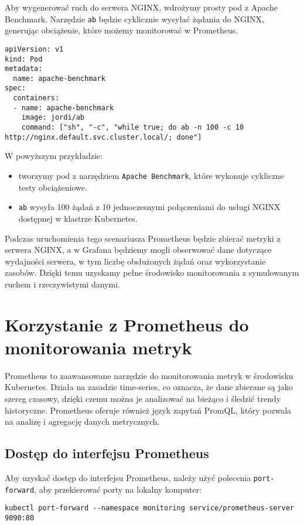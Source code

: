 \documentclass{article}
\begin{document}
Aby wygenerować ruch do serwera NGINX, wdrożymy prosty pod z Apache Benchmark. Narzędzie \texttt{ab} będzie cyklicznie wysyłać żądania do NGINX, generując obciążenie, które możemy monitorować w Prometheus.

\begin{lstlisting}
apiVersion: v1
kind: Pod
metadata:
  name: apache-benchmark
spec:
  containers:
  - name: apache-benchmark
    image: jordi/ab
    command: ["sh", "-c", "while true; do ab -n 100 -c 10 http://nginx.default.svc.cluster.local/; done"]
\end{lstlisting}

W powyższym przykładzie:
\begin{itemize}
  \item tworzymy pod z narzędziem \texttt{Apache Benchmark}, które wykonuje cykliczne testy obciążeniowe.
  \item \texttt{ab} wysyła 100 żądań z 10 jednoczesnymi połączeniami do usługi NGINX dostępnej w klastrze Kubernetes.
\end{itemize}

Podczas uruchomienia tego scenariusza Prometheus będzie zbierać metryki z serwera NGINX, a w Grafana będziemy mogli obserwować dane dotyczące wydajności serwera, w tym liczbę obsłużonych żądań oraz wykorzystanie zasobów. Dzięki temu uzyskamy pełne środowisko monitorowania z symulowanym ruchem i rzeczywistymi danymi.



\section{Korzystanie z Prometheus do monitorowania metryk}

Prometheus to zaawansowane narzędzie do monitorowania metryk w środowisku Kubernetes. Działa na zasadzie time-series, co oznacza, że dane zbierane są jako szereg czasowy, dzięki czemu można je analizować na bieżąco i śledzić trendy historyczne. Prometheus oferuje również język zapytań PromQL, który pozwala na analizę i agregację danych metrycznych.

\subsection{Dostęp do interfejsu Prometheus}

Aby uzyskać dostęp do interfejsu Prometheus, należy użyć polecenia \texttt{port-forward}, aby przekierować porty na lokalny komputer:

\begin{lstlisting}
kubectl port-forward --namespace monitoring service/prometheus-server 9090:80
\end{lstlisting}
\end{document}
